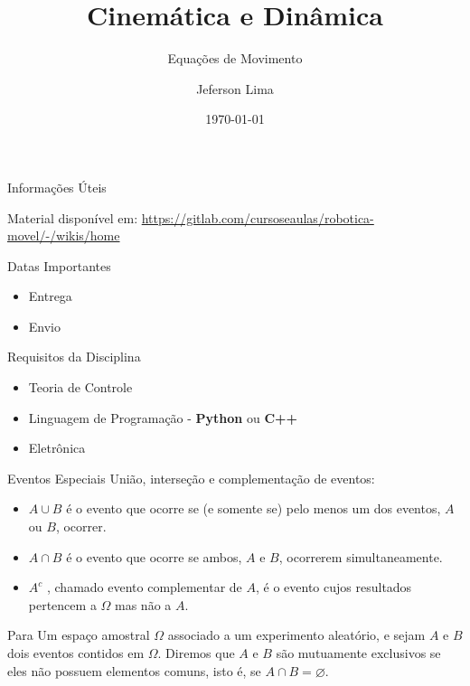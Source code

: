 \documentclass{beamer}
\title{Cinemática e Dinâmica}
\subtitle{Equações de Movimento}
\date{\today}
\author{Jeferson Lima}
\institute{\url{http://gitlab.com/jeferson.lima}}
\newcommand{\pausar}{\pause}
\begin{document}
\maketitle

\begin{frame}{Informações Úteis}
	\begin{block}{Material disponível em:}
		\href{Robótica Móvel - Wiki}{https://gitlab.com/cursoseaulas/robotica-movel/-/wikis/home}
	\end{block}
	\pausar
	\begin{block}{Datas Importantes}
		\begin{itemize}
		\item Entrega
		\item Envio
		\end{itemize}
	\end{block}
	\pausar
	\begin{block}{Requisitos da Disciplina}
		\begin{itemize}
		\item Teoria de Controle
		\item Linguagem de Programação - \textbf{Python} ou \textbf{C++}
		\item Eletrônica
		\end{itemize}
	\end{block}
\end{frame}



\begin{frame}{Eventos Especiais}
União, interseção e complementação de eventos:

\begin{itemize}
	\item $A  \cup B$ é o evento que ocorre se (e somente se) pelo menos um dos eventos, $A$ ou $B$, ocorrer.
	\item $A \cap B$ é o evento que ocorre se ambos, $A$ e $B$, ocorrerem simultaneamente.
	\item $A^c$ , chamado evento complementar de $A$, é o evento cujos resultados pertencem a $\Omega$ mas não a $A$.
\end{itemize}

\begin{exampleblock}{Para}
	Um espaço amostral $\Omega$ associado a um experimento aleatório, e sejam $A$ e $B$ dois eventos
	contidos em $\Omega$. Diremos que $A$ e $B$ são mutuamente exclusivos se eles não possuem elementos comuns,
	isto é, se $A \cap B = \varnothing$.
\end{exampleblock}

\end{frame}
\end{document}
